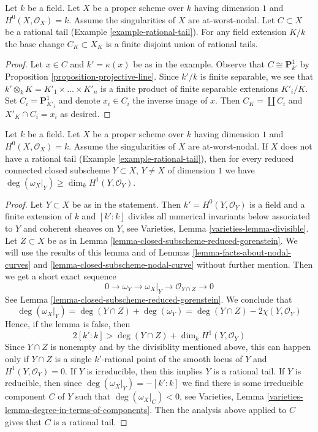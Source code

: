 \begin{lemma}
\label{lemma-rational-tail-field-extension}
Let $k$ be a field. Let $X$ be a proper scheme over $k$ having dimension $1$
and $H^0(X, \mathcal{O}_X) = k$. Assume the singularities of $X$ are
at-worst-nodal. Let $C \subset X$ be a rational tail
(Example \ref{example-rational-tail}).
For any field extension $K/k$ the base change $C_K \subset X_K$
is a finite disjoint union of rational tails.
\end{lemma}

\begin{proof}
Let $x \in C$ and $k' = \kappa(x)$ be as in the example.
Observe that $C \cong \mathbf{P}^1_{k'}$ by
Proposition \ref{proposition-projective-line}.
Since $k'/k$ is finite separable, we see that
$k' \otimes_k K = K'_1 \times \ldots \times K'_n$
is a finite product of finite separable extensions $K'_i/K$.
Set $C_i = \mathbf{P}^1_{K'_i}$ and denote $x_i \in C_i$
the inverse image of $x$. Then $C_K = \coprod C_i$ and
$X'_K \cap C_i = x_i$ as desired.
\end{proof}

\begin{lemma}
\label{lemma-no-rational-tail}
Let $k$ be a field. Let $X$ be a proper scheme over $k$ having dimension $1$
and $H^0(X, \mathcal{O}_X) = k$. Assume the singularities of $X$ are
at-worst-nodal. If $X$ does not have a rational tail
(Example \ref{example-rational-tail}),
then for every reduced connected closed subscheme
$Y \subset X$, $Y \not = X$ of dimension $1$ we have
$\deg(\omega_X|_Y) \geq \dim_k H^1(Y, \mathcal{O}_Y)$.
\end{lemma}

\begin{proof}
Let $Y \subset X$ be as in the statement. Then $k' = H^0(Y, \mathcal{O}_Y)$
is a field and a finite extension of $k$ and $[k' : k]$
divides all numerical invariants below associated to $Y$ and
coherent sheaves on $Y$, see
Varieties, Lemma \ref{varieties-lemma-divisible}.
Let $Z \subset X$ be as in
Lemma \ref{lemma-closed-subscheme-reduced-gorenstein}.
We will use the results of this lemma and of
Lemmas \ref{lemma-facts-about-nodal-curves} and
\ref{lemma-closed-subscheme-nodal-curve} without further mention.
Then we get a short exact sequence
$$
0 \to \omega_Y \to \omega_X|_Y \to \mathcal{O}_{Y \cap Z} \to 0
$$
See Lemma \ref{lemma-closed-subscheme-reduced-gorenstein}.
We conclude that
$$
\deg(\omega_X|_Y) = \deg(Y \cap Z) + \deg(\omega_Y) =
\deg(Y \cap Z) - 2\chi(Y, \mathcal{O}_Y)
$$
Hence, if the lemma is false, then
$$
2[k' : k] > \deg(Y \cap Z) + \dim_k H^1(Y, \mathcal{O}_Y)
$$
Since $Y \cap Z$ is nonempty and by the divisiblity mentioned above,
this can happen only if $Y \cap Z$ is a single $k'$-rational point
of the smooth locus of $Y$ and $H^1(Y, \mathcal{O}_Y) = 0$.
If $Y$ is irreducible, then this implies $Y$ is a rational tail.
If $Y$ is reducible, then since $\deg(\omega_X|_Y) = -[k' : k]$
we find there is some irreducible component $C$ of $Y$
such that $\deg(\omega_X|_C) < 0$, see
Varieties, Lemma \ref{varieties-lemma-degree-in-terms-of-components}.
Then the analysis above applied
to $C$ gives that $C$ is a rational tail.
\end{proof}

